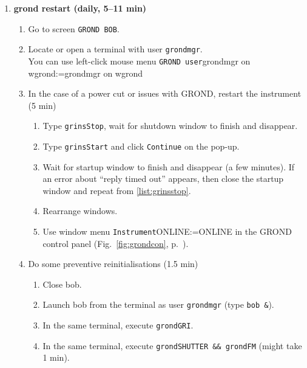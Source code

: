 \documentclass[11pt,fleqn]{book}
\makeatletter
\def\menu#1#2{\texttt{#1}\ifx{}#2\else\@for\@x:=#2\do{$\rightarrow$\texttt{\@x}}\fi}
\def\wmenu#1#2{window menu \menu{#1}{#2}}
\def\mmenu#1#2{left-click mouse menu \menu{#1}{#2}}
\def\figref#1{Fig.~\ref{fig:#1}, p.~\pageref{fig:#1}}
\makeatother
\begin{document}
\begin{enumerate}
\begin{enumerate}
\begin{enumerate}
\begin{enumerate}
              \item Re-run it (point \ref{list:ferostestob}).
            \end{enumerate}
            \item \texttt{FEROS General State} panel, select \wmenu{Telescope}{IGNORE}
           \end{enumerate}
        \end{enumerate}
  \item \textbf{\gls{grond} restart (daily, 5--11 min)}
        \label{list:grond}
        \begin{enumerate}
         \item Go to screen \texttt{GROND BOB}.
         \item Locate or open a terminal with user \texttt{grondmgr}.\\
               You can use \mmenu{GROND user}{grondmgr on wgrond}
         \item In the case of a power cut or issues with GROND, restart the instrument (5 min)
         \begin{enumerate}
           \item Type \texttt{grinsStop}, wait for shutdown window to finish and disappear.\label{list:grinsstop}
            \item Type \texttt{grinsStart} and click \texttt{Continue} on the pop-up.
            \item Wait for startup window to finish and disappear (a few minutes). If an error about ``reply timed out'' appears, then close the startup window and repeat from \ref{list:grinsstop}. \label{list:grinsstart}
            \item Rearrange windows.
            \item Use \wmenu{Instrument}{ONLINE} in the GROND control panel (\figref{grondcon}).\label{list:grondonline}
         \end{enumerate}
         \item Do some preventive reinitialisations (1.5 min)\label{list:grond-prophylaxis}
           \begin{enumerate}
             \item Close \gls{bob}.
             \item Launch \gls{bob} from the terminal as user \texttt{grondmgr} (type \texttt{bob \&}).
             \item In the same terminal, execute \texttt{grondGRI}.
             \item In the same terminal, execute \texttt{grondSHUTTER \&\& grondFM} (might take 1 min).

\end{enumerate}
\end{enumerate}
\end{enumerate}
\end{document}
